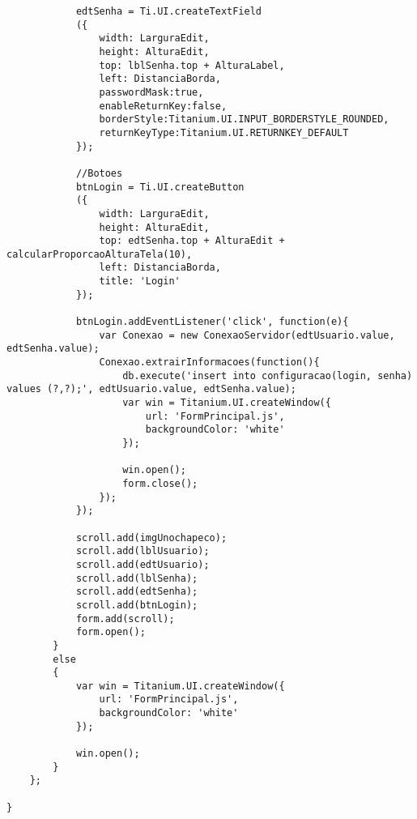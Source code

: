 \begin{lstlisting}
			edtSenha = Ti.UI.createTextField
			({
				width: LarguraEdit,
			  	height: AlturaEdit,
			  	top: lblSenha.top + AlturaLabel,
			    left: DistanciaBorda,
			    passwordMask:true,
			    enableReturnKey:false,
			   	borderStyle:Titanium.UI.INPUT_BORDERSTYLE_ROUNDED,
			   	returnKeyType:Titanium.UI.RETURNKEY_DEFAULT
			});
			
			//Botoes
			btnLogin = Ti.UI.createButton
			({
				width: LarguraEdit,
				height: AlturaEdit,
				top: edtSenha.top + AlturaEdit + calcularProporcaoAlturaTela(10),
			    left: DistanciaBorda,
			    title: 'Login'
			});
			
			btnLogin.addEventListener('click', function(e){
				var Conexao = new ConexaoServidor(edtUsuario.value, edtSenha.value);
				Conexao.extrairInformacoes(function(){
					db.execute('insert into configuracao(login, senha) values (?,?);', edtUsuario.value, edtSenha.value);
					var win = Titanium.UI.createWindow({
		    			url: 'FormPrincipal.js',
		    			backgroundColor: 'white'
					});
					
					win.open();
					form.close();
				});
			});
			
			scroll.add(imgUnochapeco);
			scroll.add(lblUsuario);
			scroll.add(edtUsuario);
			scroll.add(lblSenha);
			scroll.add(edtSenha);
			scroll.add(btnLogin);
			form.add(scroll);
			form.open();
		}
		else
		{
			var win = Titanium.UI.createWindow({
		    	url: 'FormPrincipal.js',
		    	backgroundColor: 'white'
			});
					
			win.open();
		}
	};
		
}
\end{lstlisting}

